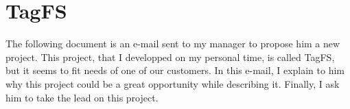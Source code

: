 \chapter{TagFS}


The following document is an e-mail sent to my manager to propose him a new project. This project, that I developped on my personal time, is called TagFS, but it seems to fit needs of one of our customers. In this e-mail, I explain to him why this project could be a great opportunity while describing it. Finally, I ask him to take the lead on this project.

\clearpage

